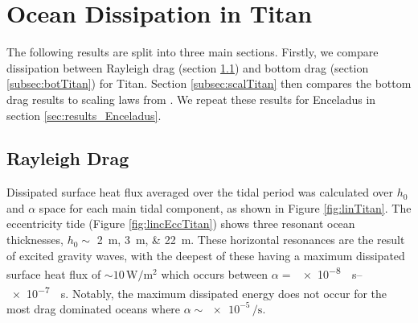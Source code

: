 \section{Ocean Dissipation in Titan \label{sec:results_Titan}}

The following results are split into three main sections. Firstly, we compare dissipation between Rayleigh drag (section \ref{sec:ray_titan}) and bottom drag (section \ref{subsec:botTitan}) for Titan. Section \ref{subsec:scalTitan} then compares the bottom drag results to scaling laws from \citet{chen2013tidal}. We repeat these results for Enceladus in section \ref{sec:results_Enceladus}.

\subsection{Rayleigh Drag}\label{sec:ray_titan}

Dissipated surface heat flux averaged over the tidal period was calculated over $h_0$ and $\alpha$ space for each main tidal component, as shown in Figure \ref{fig:linTitan}. The eccentricity tide (Figure \ref{fig:lincEccTitan}) shows three resonant ocean thicknesses, $h_0 \sim$ \SIlist{2;3;22}{\metre}. These horizontal resonances are the result of excited gravity waves, with the deepest of these having a maximum dissipated surface heat flux of $\sim 10\, \si{\watt\per\square\metre}$ which occurs between $\alpha =$ \SIrange{e-8}{e-7}{\per\second}. Notably, the maximum dissipated energy does not occur for the most drag dominated oceans where $\alpha \sim \num{e-5} \, \si{\per\second}$. 


